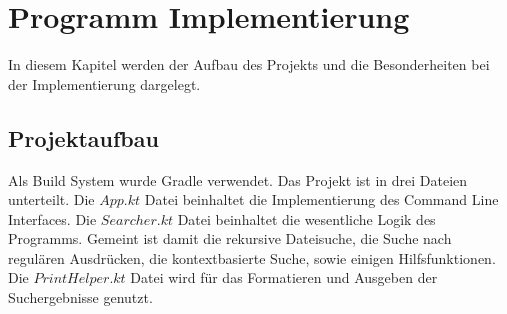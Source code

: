 \documentclass{article}
\begin{document}
\section{Programm Implementierung}
In diesem Kapitel werden der Aufbau des Projekts und die Besonderheiten bei der Implementierung dargelegt.
\subsection{Projektaufbau}
Als Build System wurde Gradle verwendet. Das Projekt ist in drei Dateien unterteilt. Die $App.kt$ Datei beinhaltet die Implementierung des Command Line Interfaces. Die $Searcher.kt$ Datei beinhaltet die wesentliche Logik des Programms. Gemeint ist damit die rekursive Dateisuche, die Suche nach regulären Ausdrücken, die kontextbasierte Suche, sowie einigen Hilfsfunktionen. Die $PrintHelper.kt$ Datei wird für das Formatieren und Ausgeben der Suchergebnisse genutzt.
\end{document}
